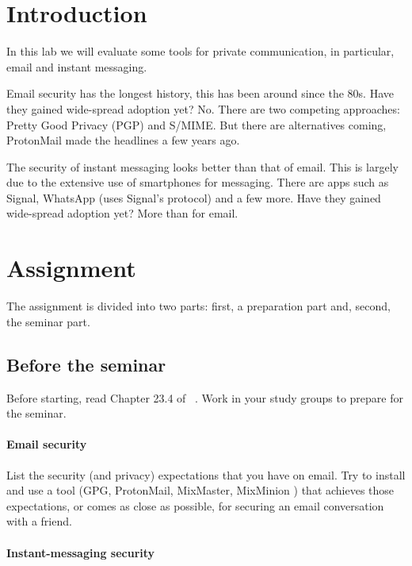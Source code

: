 \mode*

\section{Introduction}%
\label{Introduction}

In this lab we will evaluate some tools for private communication, in 
particular, email and instant messaging.

Email security has the longest history, this has been around since the 80s.
Have they gained wide-spread adoption yet?
No.
There are two competing approaches: Pretty Good Privacy (PGP) and S/MIME.
But there are alternatives coming, \eg ProtonMail made the headlines a few 
years ago.

The security of instant messaging looks better than that of email.
This is largely due to the extensive use of smartphones for messaging.
There are apps such as Signal, WhatsApp (uses Signal's protocol) and a few 
more.
Have they gained wide-spread adoption yet?
More than for email.


\section{Assignment}%
\label{sec:Tasks}

The assignment is divided into two parts: first, a preparation part and, 
second, the seminar part.

\subsection{Before the seminar}

Before starting, read Chapter 23.4 of 
~\cite{Anderson2008sea}.
Work in your study groups to prepare for the seminar.

\paragraph{Email security}

List the security (and privacy) expectations that you have on email.
Try to install and use a tool (\eg GPG, ProtonMail, MixMaster, MixMinion \etc) 
that achieves those expectations, or comes as close as possible, for securing 
an email conversation with a friend.

\paragraph{Instant-messaging security}

